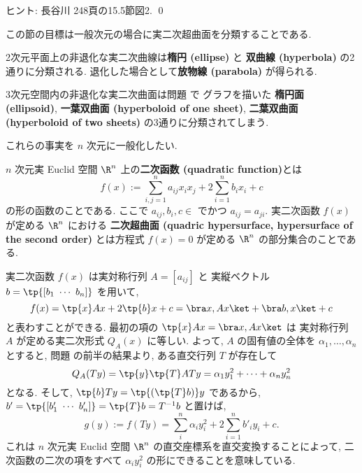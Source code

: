 \documentclass[12pt,twoside]{jarticle}
\begin{document}
\noindent
ヒント: 長谷川 \cite{hasegawa} 248頁の15.5節図2.
\qed

\bigskip

この節の目標は一般次元の場合に実二次超曲面を分類することである.

2次元平面上の非退化な実二次曲線は{\bf 楕円 (ellipse)} と
{\bf 双曲線 (hyperbola)} の2通りに分類される.
退化した場合として{\bf 放物線 (parabola)} が得られる.

3次元空間内の非退化な実二次曲面は問題  で
グラフを描いた
{\bf 楕円面 (ellipsoid)}, 
{\bf 一葉双曲面 (hyperboloid of one sheet)}, 
{\bf 二葉双曲面 (hyperboloid of two sheets)}
の3通りに分類されてしまう.

これらの事実を $n$ 次元に一般化したい.

\medskip

$n$ 次元実 Euclid 空間 $\R^n$ 上の{\bf 二次函数 (quadratic function)}とは
\begin{equation*}
  f(x) := \sum_{i,j=1}^n a_{ij}x_ix_j + 2\sum_{i=1}^n b_ix_i + c
\end{equation*}
の形の函数のことである. ここで $a_{ij},b_i,c\in$ でかつ $a_{ij}=a_{ji}$.
実二次函数 $f(x)$ が定める $\R^n$ における
{\bf 二次超曲面 (quadric hypersurface, hypersurface of the second order)} 
とは方程式 $f(x)=0$ が定める $\R^n$ の部分集合のことである.

実二次函数 $f(x)$ は実対称行列 $A=[a_{ij}]$ と
実縦ベクトル $b=\tp{[b_1\ \cdots\ b_n]}$ を用いて,
\begin{equation*}
  f(x) = \tp{x}Ax + 2\tp{b}x + c = \bra x,Ax\ket + \bra b,x\ket + c
\end{equation*}
と表わすことができる.  最初の項の $\tp{x}Ax=\bra x,Ax\ket$ は
実対称行列 $A$ が定める実二次形式 $Q_A(x)$ に等しい.
よって, $A$ の固有値の全体を $\alpha_1,\dots,\alpha_n$ とすると, 
問題  の前半の結果より, 
ある直交行列 $T$ が存在して
\begin{equation*}
  Q_A(Ty) = \tp{y}\tp{T}ATy = \alpha_1 y_1^2 + \cdots + \alpha_n y_n^2
\end{equation*}
となる. そして, $\tp{b}Ty=\tp{(\tp{T}b)}y$ であるから,
$b'=\tp{[b'_1\ \cdots\ b'_n]}=\tp{T}b=T^{-1}b$ と置けば,
\begin{equation*}
  g(y) := f(Ty) 
  = \sum_{i}^n \alpha_i y_i^2 + 2\sum_{i=1}^n b'_i y_i + c.
\tag{0}
\end{equation*}
これは $n$ 次元実 Euclid 空間 $\R^n$ の直交座標系を直交変換することによって,
二次函数の二次の項をすべて $\alpha_i y_i^2$ の形にできることを意味している.
\end{document}
